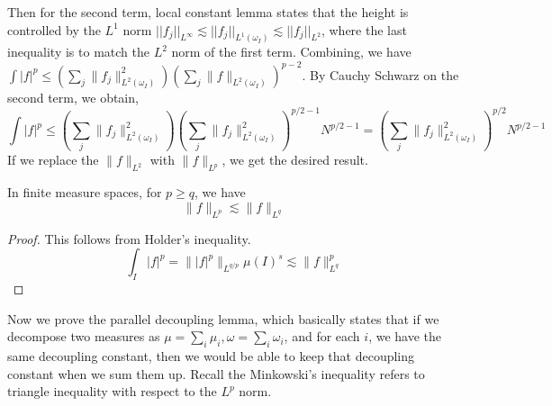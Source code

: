 Then for the second term, local constant lemma states that the height is controlled by the $L^1$ norm $||f_j||_{L^\infty}\lesssim ||f_j||_{L^1(\omega_I)}\lesssim ||f_j||_{L^2}$, where the last inequality is to match the $L^2$ norm of the first term. Combining, we have $\int|f|^p\leq (\sum_j\|f_j\|_{L^2(\omega_I)}^2)(\sum_j\|f\|_{L^2(\omega_I)})^{p-2}$. By Cauchy Schwarz on the second term, we obtain,
\begin{equation*}
    \int|f|^p\leq\left(\sum_{j}\|f_j\|_{L^2(\omega_I)}^2 \right)\left(\sum_{j}\|f_j\|_{L^2(\omega_I)}^2 \right)^{p/2-1}N^{p/2-1}=\left(\sum_{j}\|f_j\|_{L^2(\omega_I)}^2 \right)^{p/2}N^{p/2-1}
\end{equation*}
If we replace the $\|f\|_{L^2}$ with $\|f\|_{L^p}$, we get the desired result.

\begin{lemma}
    In finite measure spaces, for $p\geq q$, we have 
    \begin{equation*}
        \|f\|_{L^p}\lesssim \|f\|_{L^q}
    \end{equation*}
\end{lemma}
\begin{proof} This follows from Holder's inequality.
    \begin{equation*}
        \int_I|f|^p=\| |f|^p \|_{L^{q/p}}\mu(I)^{s}\lesssim\|f\|_{L^q}^p
    \end{equation*}
\end{proof}

Now we prove the parallel decoupling lemma, which basically states that if we decompose two measures as $\mu=\sum_i\mu_i, \omega=\sum_i\omega_i$, and for each $i$, we have the same decoupling constant, then we would be able to keep that decoupling constant when we sum them up. Recall the Minkowski's inequality refers to triangle inequality with respect to the $L^p$ norm.

